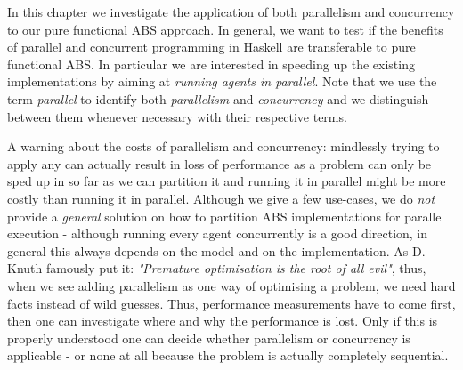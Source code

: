 In this chapter we investigate the application of both parallelism and concurrency to our pure functional ABS approach. In general, we want to test if the benefits of parallel and concurrent programming in Haskell are transferable to pure functional ABS. In particular we are interested in speeding up the existing implementations by aiming at \textit{running agents in parallel}. Note that we use the term \textit{parallel} to identify both \textit{parallelism} and \textit{concurrency} and we distinguish between them whenever necessary with their respective terms.

A warning about the costs of parallelism and concurrency: mindlessly trying to apply any can actually result in loss of performance as a problem can only be sped up in so far as we can partition it and running it in parallel might be more costly than running it in parallel. Although we give a few use-cases, we do \textit{not} provide a \textit{general} solution on how to partition ABS implementations for parallel execution - although running every agent concurrently is a good direction, in general this always depends on the model and on the implementation. As D. Knuth famously put it: \textit{"Premature optimisation is the root of all evil"}, thus, when we see adding parallelism as one way of optimising a problem, we need hard facts instead of wild guesses. Thus, performance measurements have to come first, then one can investigate where and why the performance is lost. Only if this is properly understood one can decide whether parallelism or concurrency is applicable - or none at all because the problem is actually completely sequential.





